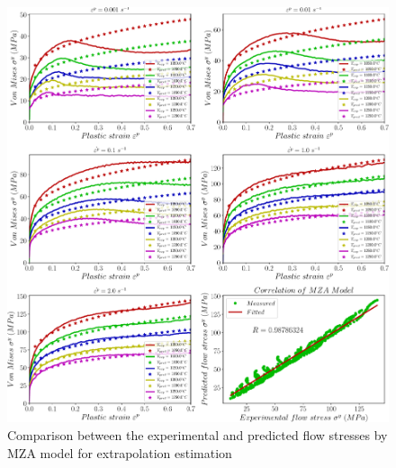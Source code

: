 \documentclass[twoside,english,1p,final,sort&compress]{elsarticle}
\theoremstyle{plain}
\begin{document}
\begin{figure}[!ht]
\centering
\includegraphics[width=1.02\columnwidth]
{newFigures/eCorrelationMZA}
\caption{Comparison between the experimental and predicted flow stresses by MZA model for extrapolation estimation}
\label{fig:eCorrelationMZA}
\end{figure}
\FloatBarrier

\end{document}
